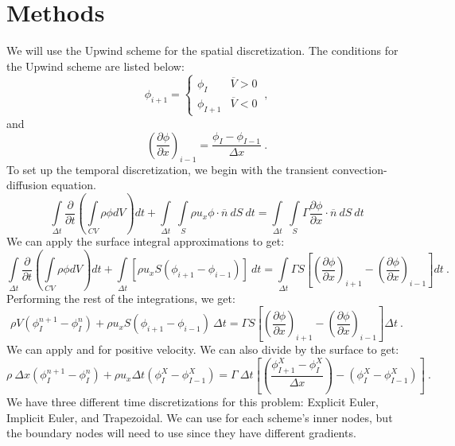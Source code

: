 \documentclass[12pt]{article}
\begin{document}
\section{Methods}
We will use the Upwind scheme for the spatial discretization. The conditions for the Upwind scheme are listed below:
\begin{equation}
    \phi_{i+1} = \begin{cases}
                    \phi_{I} & \overline{V} > 0\\
                    \phi_{I+1} & \overline{V} < 0
                 \end{cases}\:,
    \label{eq:upwind conditions}
\end{equation}
and
\begin{equation}
    \left(\frac{\partial \phi}{\partial x}\right)_{i-1} = \frac{\phi_{I} - \phi_{I-1}}{\Delta x}\:.
    \label{eq:cds gradient}
\end{equation}
To set up the temporal discretization, we begin with the transient convection-diffusion equation.
\begin{equation}
    \int\limits_{\Delta t}\frac{\partial}{\partial t}\left( \int\limits_{CV}\rho\phi dV \right)dt + \int\limits_{\Delta t}\:\int\limits_{S}\rho u_x \phi \cdot \overline{n}\:dS\:dt = \int\limits_{\Delta t}\:\int\limits_{S} \Gamma \frac{\partial \phi}{\partial x} \cdot \overline{n}\:dS\:dt
    \label{eq:trans conv diff}
\end{equation}
We can apply the surface integral approximations to get:
\begin{equation*}
    \int\limits_{\Delta t}\frac{\partial}{\partial t}\left( \int\limits_{CV}\rho\phi dV \right)dt + \int\limits_{\Delta t}\left[ \rho u_x S\left( \phi_{i+1} - \phi_{i-1} \right) \right]\:dt = \int\limits_{\Delta t}\Gamma S\left[ \left( \frac{\partial \phi}{\partial x} \right)_{i+1} - \left( \frac{\partial \phi}{\partial x} \right)_{i-1} \right] dt\:.
\end{equation*}
Performing the rest of the integrations, we get:
\begin{equation}
    \rho V \left( \phi_{I}^{n+1} - \phi_{I}^{n} \right) + \rho u_x S \left( \phi_{i+1} - \phi_{i-1} \right)\:\Delta t = \Gamma S \left[ \left( \frac{\partial \phi}{\partial x} \right)_{i+1} - \left( \frac{\partial \phi}{\partial x} \right)_{i-1} \right]\Delta t\:.
    \label{eq:trans disc}
\end{equation}
We can apply  and  for positive velocity. We can also divide by the surface to get:
\begin{equation}
    \rho\: \Delta x \left( \phi_{I}^{n+1} - \phi_{I}^{n} \right) + \rho u_x \Delta t \left( \phi_{I}^{X} - \phi_{I-1}^{X} \right) = \Gamma\:\Delta t \left[ \left( \frac{\phi_{I+1}^{X} - \phi_{I}^{X}}{\Delta x} \right) - \left( \phi_{I}^{X} - \phi_{I-1}^{X} \right) \right]\:.
    \label{eq:trans upwind}
\end{equation}
We have three different time discretizations for this problem: Explicit Euler, Implicit Euler, and Trapezoidal. We can use  for each scheme's inner nodes, but the boundary nodes will need to use  since they have different gradients.
\end{document}

